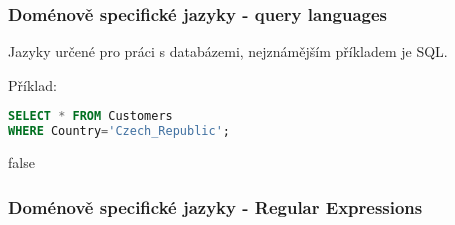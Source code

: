 \begin{frame}[fragile]
    \frametitle{Doménově specifické jazyky - query languages}
    Jazyky určené pro práci s databázemi, nejznámějším příkladem je SQL.

Příklad:

    \begin{lstlisting}[language=SQL]
SELECT * FROM Customers
WHERE Country='Czech_Republic'; 
    \end{lstlisting}
    
    
\end{frame}


\if false
\begin{frame}
    \frametitle{Doménově specifické jazyky - Regular Expressions}


\end{frame}
\fi
